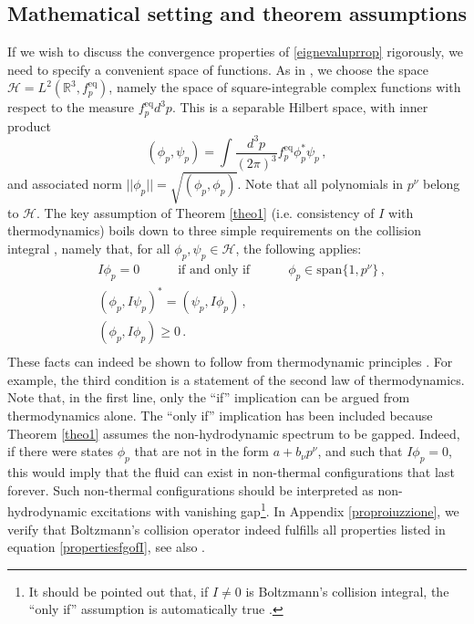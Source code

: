 \documentclass[a4paper, amsfonts, amssymb, amsmath, reprint, showkeys, nofootinbib, twoside, onecolumn,notitlepage]{revtex4-2}
\newcommand{\spc}{\quad \quad \quad}
\theoremstyle{definition}
\theoremstyle{theorem}
\theoremstyle{corollary}
\begin{document}
\subsection{Mathematical setting and theorem assumptions}\label{assumpzione}

If we wish to discuss the convergence properties of \eqref{eignevaluprrop} rigorously, we need to specify a convenient space of functions. As in \cite{GavassinoGapless2024rck}, we choose the space $\mathcal{H}=L^2(\mathbb{R}^3,f^{\text{eq}}_p)$, namely the space of square-integrable complex functions with respect to the measure $f^{\text{eq}}_p d^3p$. This is a separable Hilbert space, with inner product
\begin{equation}
    (\phi_p,\psi_p)= \int \dfrac{d^3 p}{(2\pi)^3} f_p^{\text{eq}} \phi^*_p \psi_p \, ,
\end{equation}
and associated norm $|| \phi_p||=\sqrt{(\phi_p,\phi_p)}$. Note that all polynomials in $p^\nu$ belong to $\mathcal{H}$. The key assumption of Theorem \ref{theo1} (i.e. consistency of $I$ with thermodynamics) boils down to three simple requirements on the collision integral \cite{GavassinoGapless2024rck}, namely that, for all $\phi_p,\psi_p \in \mathcal{H}$, the following applies: 
\begin{equation}\label{propertiesfgofI}
\begin{split}
& I\phi_p=0 \spc \text{if and only if} \spc \phi_p\in \text{span}\{1,p^\nu \} \, , \\
& (\phi_p,I\psi_p)^*=(\psi_p,I\phi_p) \, , \\
& (\phi_p,I\phi_p) \geq 0 \, . \\
\end{split}
\end{equation}
These facts can indeed be shown to follow from thermodynamic principles \cite{GavassinoGapless2024rck,GavassinoCasmir2022,RochaGavassinoFluctu:2024afv}. For example, the third condition is a statement of the second law of thermodynamics. Note that, in the first line, only the ``if'' implication can be argued from thermodynamics alone. The ``only if'' implication has been included because Theorem \ref{theo1} assumes the non-hydrodynamic spectrum to be gapped. Indeed, if there were states $\phi_p$ that are not in the form $a+b_\nu p^\nu$, and such that $I\phi_p=0$, this would imply that the fluid can exist in non-thermal configurations that last forever. Such non-thermal configurations should be interpreted as non-hydrodynamic excitations with vanishing gap\footnote{It should be pointed out that, if $I \neq 0$ is Boltzmann's collision integral, the ``only if'' assumption is automatically true \cite[\S IX.1.b]{Groot1980RelativisticKT}.}. In Appendix \ref{proproiuzzione}, we verify that Boltzmann's collision operator indeed fulfills all properties listed in equation \eqref{propertiesfgofI}, see also \cite{cercignani_book}.
\end{document}
